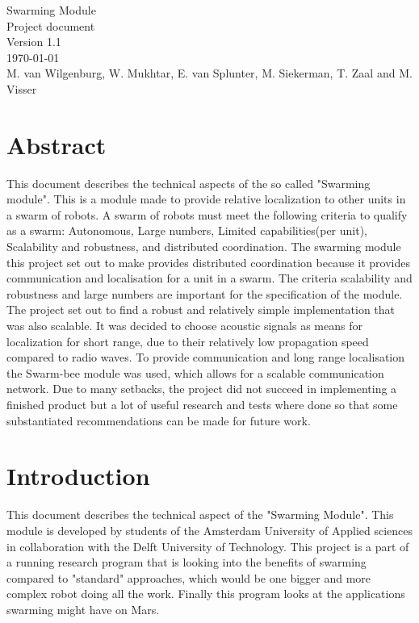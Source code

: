\documentclass[10pt,a4paper]{article}
\begin{document}
\begin{titlepage}
    \centering
    \vfill
    {\Large

    Swarming Module\\

   
    {\small Project document}\\
    {\small Version 1.1}\\
    {\small \today}\\
        
        \vskip2cm
        {\small M. van Wilgenburg, W. Mukhtar, E. van Splunter, M. Siekerman, T. Zaal and M. Visser}\\
    }    
    \vfill
    
    \vfill
    \vfill
\end{titlepage}

\newpage

\listoffigures
\newpage

\listoftables
\newpage

\tableofcontents
\newpage

\section{Abstract}
This document describes the technical aspects of the so called "Swarming module". This is a module made to provide relative localization to other units in a swarm of robots. A swarm of robots must meet the following criteria to qualify as a swarm: Autonomous, Large numbers, Limited capabilities(per unit), Scalability and robustness, and distributed coordination. The swarming module this project set out to make provides distributed coordination because it provides communication and localisation for a unit in a swarm. The criteria scalability and robustness and large numbers are important for the specification of the module. The project set out to find a robust and relatively simple implementation that was also scalable. It was decided to choose acoustic signals as means for localization for short range, due to their relatively low propagation speed compared to radio waves. To provide communication and long range localisation the Swarm-bee module was used, which allows for a scalable communication network. Due to many setbacks, the project did not succeed in implementing a finished product but a lot of useful research and tests where done so that some substantiated recommendations can be made for future work.
\newpage

\section{Introduction}
This document describes the technical aspect of the "Swarming Module". This module is developed by students of the Amsterdam University of Applied sciences in collaboration with the Delft University of Technology.   This project is a part of a running research program that is looking into the benefits of swarming compared to "standard" approaches, which would be one bigger and more complex robot doing all the work. Finally this program looks at the applications swarming might have on Mars. 
\end{document}
